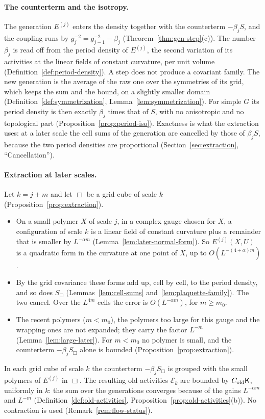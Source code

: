 \paragraph{The counterterm and the isotropy.} The generation $E^{(j)}$ enters the density together with the counterterm $-\beta_jS$, and the coupling runs by $g_j^{-2}=g_{j-1}^{-2}-\beta_j$ (Theorem~\ref{thm:gen-step}(c)). The number $\beta_j$ is read off from the period density of $E^{(j)}$, the second variation of its activities at the linear fields of constant curvature, per unit volume (Definition~\ref{def:period-density}). A step does not produce a covariant family. The new generation is the average of the raw one over the symmetries of its grid, which keeps the sum and the bound, on a slightly smaller domain (Definition~\ref{def:symmetrization}, Lemma~\ref{lem:symmetrization}). For simple $G$ its period density is then exactly $\beta_j$ times that of $S$, with no anisotropic and no topological part (Proposition~\ref{prop:period-iso}). Exactness is what the extraction uses: at a later scale the cell sums of the generation are cancelled by those of $\beta_jS$, because the two period densities are proportional (Section~\ref{sec:extraction}, ``Cancellation'').

\paragraph{Extraction at later scales.} Let $k=j+m$ and let $\Box$ be a grid cube of scale $k$ (Proposition~\ref{prop:extraction}).
\begin{itemize}
\item On a small polymer $X$ of scale $j$, in a complex gauge chosen for $X$, a configuration of scale $k$ is a linear field of constant curvature plus a remainder that is smaller by $L^{-\alpha m}$ (Lemma~\ref{lem:later-normal-form}). So $E^{(j)}(X,U)$ is a quadratic form in the curvature at one point of $X$, up to $O(L^{-(4+\alpha)m})$.
\item By the grid covariance these forms add up, cell by cell, to the period density, and so does $S_\Box$ (Lemmas~\ref{lem:cell-sums} and~\ref{lem:plaquette-family}). The two cancel. Over the $L^{4m}$ cells the error is $O(L^{-\alpha m})$, for $m\ge m_0$.
\item The recent polymers ($m<m_0$), the polymers too large for this gauge and the wrapping ones are not expanded; they carry the factor $L^{-m}$ (Lemma~\ref{lem:large-later}). For $m<m_0$ no polymer is small, and the counterterm $-\beta_jS_\Box$ alone is bounded (Proposition~\ref{prop:extraction}).
\end{itemize}
In each grid cube of scale $k$ the counterterm $-\beta_jS_\Box$ is grouped with the small polymers of $E^{(j)}$ in $\Box$. The resulting old activities $\mathcal E_k$ are bounded by $C_{\rm old}\mathsf K$, uniformly in $k$: the sum over the generations converges because of the gains $L^{-\alpha m}$ and $L^{-m}$ (Definition~\ref{def:old-activities}, Proposition~\ref{prop:old-activities}(b)). No contraction is used (Remark~\ref{rem:flow-status}).

